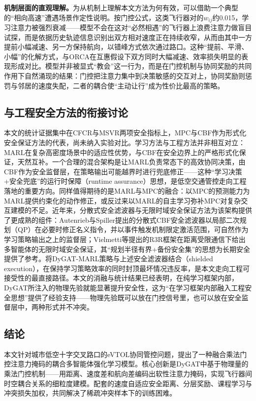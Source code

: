 \documentclass[12pt,a4paper,UTF8]{ctexart}
\begin{document}
\textbf{机制层面的直观理解。}为从机制上理解本文方法为何有效，可以借助一个典型的“相向高速”遭遇场景作定性说明。按门控公式，这类飞行器对的$w_{ij}$约0.015，学习注意力被强烈衰减——模型不会在这对“必然相遇”的飞行器上浪费注意力做盲目试探，而是依据历史轨迹信息识别出双方相对速度正在持续收窄，从而由其中一方提前小幅减速、另一方保持航向，以错峰方式依次通过路口。这种“提前、平滑、小幅”的化解方式，与ORCA在互惠假设下双方同时大幅减速、效率损失明显的表现形成对比。模型并非被显式“教会”这一行为，而是在门控机制与协同奖励的共同作用下自然涌现的结果：门控把注意力集中到决策敏感的交互对上，协同奖励则惩罚与邻居的速度失配，二者的耦合使“主动让行”成为性价比最高的策略。

\subsection{与工程安全方法的衔接讨论}

本文的统计证据集中在CFCR与MSVR两项安全指标上，MPC与CBF作为形式化安全保证方法的代表，尚未纳入实验对比。学习方法与工程方法并非相互对立：MARL在复杂高密度场景中的适应性优势，与CBF在安全边界上的严格形式化保证，天然互补。一个合理的混合架构是让MARL负责常态下的高效协同决策，由CBF作为安全监督层，在策略输出可能越界时进行兜底修正——这种“学习决策+安全兜底”的运行时保障（runtime assurance）思想，是低空交通管控走向工程落地的重要方向。同样值得期待的是MARL与MPC的融合：以MPC的预测能力为MARL提供约束化的动作修正，或反过来以MARL的自主学习弥补MPC对复杂交互建模的不足。近年来，分散式安全滤波器与无限时域安全保证方法为该架构提供了更成熟的组件：Autenrieb与Spiller\cite{ref60}提出的分散式CBF安全滤波器以局部二次规划（QP）在必要时修正名义指令，并以事件触发机制限定激活范围，可自然作为学习策略输出之上的监督层；Vielmetti等\cite{ref61}提出的R3R框架在距离受限通信下给出多智能体的无限时域安全保证，其“规划半径有界+备份安全集”的思想为长期安全提供了参考。将DyGAT-MARL策略与上述安全滤波器结合（shielded execution），在保持学习策略效率的同时封顶最坏情况违反率，是本文走向工程可接受性的最直接路径。本文的消融与统计结果已经表明，在纯学习框架内部，DyGAT所注入的物理先验就能显著提升安全性，这为“在学习框架内部融入工程安全思想”提供了经验支持——物理先验既可以放在门控信号里，也可以放在安全监督层中，两种形式并不冲突。

\subsection{结论}

本文针对城市低空十字交叉路口的eVTOL协同管控问题，提出了一种融合乘法门控注意力掩码的耦合多智能体强化学习模型。核心创新是DyGAT中基于物理量的乘法门控机制——用距离、速度差和航向差编码出软性注意力掩码，实现飞行器间时空耦合关系的细粒度建模。配套的速度自适应安全距离、分层奖励、课程学习与冲突损失加权，共同解决了稀疏冲突样本下的训练困难。
\end{document}
